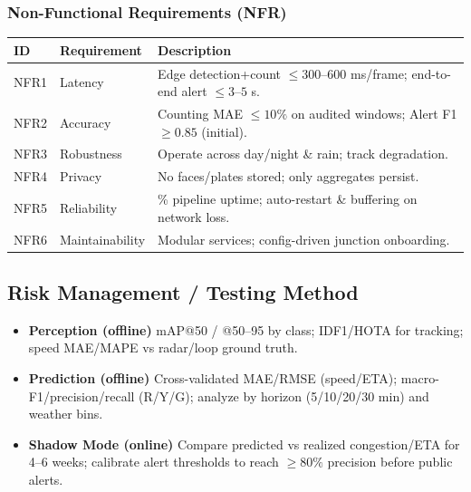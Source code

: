 \subsubsection{Non-Functional Requirements (NFR)}
\renewcommand{\arraystretch}{1.15}
\begin{tabularx}{\textwidth}{|>{\raggedright\arraybackslash}p{1.1cm}|>{\raggedright\arraybackslash}p{3.2cm}|>{\raggedright\arraybackslash}X|}
\hline
	\textbf{ID} & \textbf{Requirement} & \textbf{Description} \\
\hline
NFR1 & Latency & Edge detection+count $\le 300$--$600$ ms/frame; end-to-end alert $\le 3$--$5$ s. \\
\hline
NFR2 & Accuracy & Counting MAE $\le 10\%$ on audited windows; Alert F1 $\ge 0.85$ (initial). \\
\hline
NFR3 & Robustness & Operate across day/night \& rain; track degradation. \\
\hline
NFR4 & Privacy & No faces/plates stored; only aggregates persist. \\
\hline
NFR5 & Reliability & 99\% pipeline uptime; auto-restart \& buffering on network loss. \\
\hline
NFR6 & Maintainability & Modular services; config-driven junction onboarding. \\
\hline
\end{tabularx}

\subsection{Risk Management / Testing Method}
\begin{itemize}
	\item \textbf{Perception (offline)} mAP@50 / @50--95 by class; IDF1/HOTA for tracking; speed MAE/MAPE vs radar/loop ground truth.
	\item \textbf{Prediction (offline)} Cross-validated MAE/RMSE (speed/ETA); macro-F1/precision/recall (R/Y/G); analyze by horizon (5/10/20/30 min) and weather bins.
	\item \textbf{Shadow Mode (online)} Compare predicted vs realized congestion/ETA for 4--6 weeks; calibrate alert thresholds to reach $\ge 80\%$ precision before public alerts.
\end{itemize}


